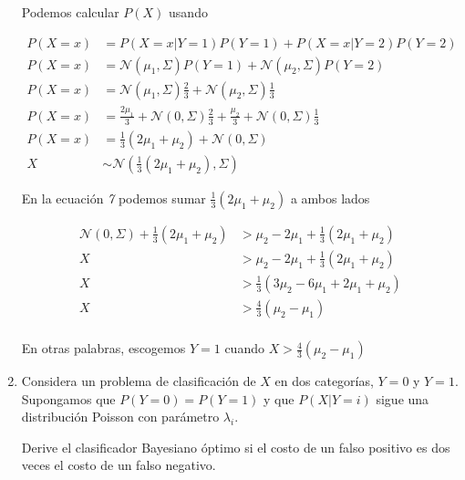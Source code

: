 \documentclass{article}
\begin{document}
\begin{enumerate}
Podemos calcular $P(X)$ usando %

  \begin{align*}
    P(X = x) &= P(X=x | Y = 1)P(Y = 1) + P(X=x | Y = 2)P(Y = 2)\\
    P(X = x) &= \mathcal{N}(\mu_1, \Sigma)P(Y = 1) + \mathcal{N}(\mu_2, \Sigma)P(Y = 2)\\
    P(X = x) &= \mathcal{N}(\mu_1, \Sigma)\frac{2}{3} + \mathcal{N}(\mu_2, \Sigma)\frac{1}{3}\\
    P(X = x) &= \frac{2\mu_1}{3} + \mathcal{N}(0, \Sigma)\frac{2}{3} + \frac{\mu_2}{3} + \mathcal{N}(0, \Sigma)\frac{1}{3}\\
    P(X = x) &= \frac{1}{3}(2\mu_1 + \mu_2) + \mathcal{N}(0, \Sigma)\\
    X &\sim \mathcal{N}(\frac{1}{3}(2\mu_1 + \mu_2), \Sigma)
  \end{align*}

En la ecuación \emph{7} podemos sumar $\frac{1}{3}(2\mu_1 + \mu_2)$ a ambos lados

\begin{align*}
\mathcal{N}(0, \Sigma) + \frac{1}{3}(2\mu_1 + \mu_2) &> \mu_2 - 2\mu_1 + \frac{1}{3}(2\mu_1 + \mu_2)\\
X &> \mu_2 - 2\mu_1 + \frac{1}{3}(2\mu_1 + \mu_2)\\
X &> \frac{1}{3}(3\mu_2 - 6\mu_1 + 2\mu_1 + \mu_2)\\
X &> \frac{4}{3}(\mu_2 -\mu_1)\\
\end{align*}

En otras palabras, escogemos $Y = 1$ cuando $X > \frac{4}{3}(\mu_2 -\mu_1)$

\item Considera un problema de clasificación de $X$ en dos categorías, $Y = 0$ y $ Y = 1$. Supongamos que $P(Y = 0) = P(Y = 1)$ y que $P(X | Y = i)$ sigue una distribución Poisson con parámetro $\lambda_i$.

Derive el clasificador Bayesiano óptimo si el costo de un falso positivo es dos veces el costo de un falso negativo.
\end{enumerate}
\end{document}
